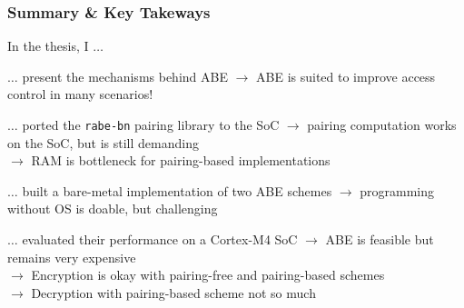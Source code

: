 \begin{frame}[c]
    \frametitle{Summary \& Key Takeways}
    
        In the thesis, I $\dots$

        \pause
        $\dots$ present the mechanisms behind ABE \textcolor{TUMGruen}{\checkmark} \pause \alert{$\rightarrow$ ABE is suited to improve access control in many scenarios!}

        \pause $\dots$ ported the \texttt{rabe-bn} pairing library to the SoC \textcolor{TUMGruen}{\checkmark} \pause \alert{$\rightarrow$ pairing computation works on the SoC, but is still demanding}\\
        \pause {} \alert{$\rightarrow$ RAM is bottleneck for pairing-based implementations}

        \pause $\dots$ built a bare-metal implementation of two ABE schemes \textcolor{TUMGruen}{\checkmark} \pause \alert{$\rightarrow$ programming without OS is doable, but challenging \smiley}

        \pause $\dots$ evaluated their performance on a Cortex-M4 SoC \textcolor{TUMGruen}{\checkmark} \pause \alert{$\rightarrow$ ABE is feasible but remains very expensive}\\        
        \pause {} \alert{$\rightarrow$ Encryption is okay with pairing-free and pairing-based schemes}\\
        \pause {} \alert{$\rightarrow$ Decryption with pairing-based scheme not so much \frownie}


\end{frame}

